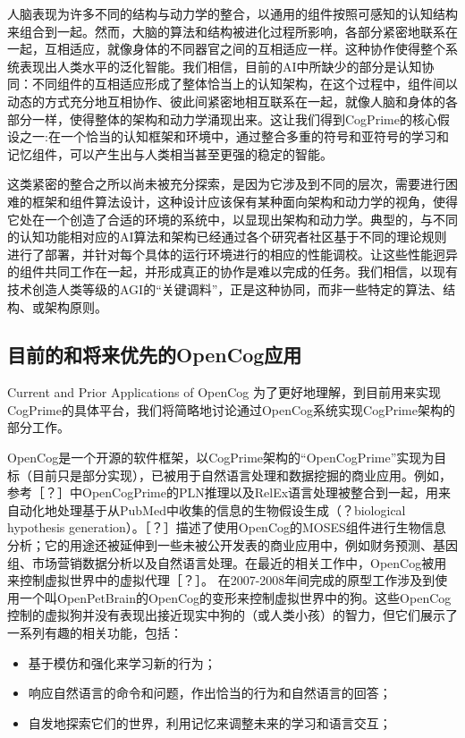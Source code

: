 人脑表现为许多不同的结构与动力学的整合，以通用的组件按照可感知的认知结构来组合到一起。然而，大脑的算法和结构被进化过程所影响，各部分紧密地联系在一起，互相适应，就像身体的不同器官之间的互相适应一样。这种协作使得整个系统表现出人类水平的泛化智能。我们相信，目前的AI中所缺少的部分是认知协同：不同组件的互相适应形成了整体恰当上的认知架构，在这个过程中，组件间以动态的方式充分地互相协作、彼此间紧密地相互联系在一起，就像人脑和身体的各部分一样，使得整体的架构和动力学涌现出来。这让我们得到CogPrime的核心假设之一:在一个恰当的认知框架和环境中，通过整合多重的符号和亚符号的学习和记忆组件，可以产生出与人类相当甚至更强的稳定的智能。

这类紧密的整合之所以尚未被充分探索，是因为它涉及到不同的层次，需要进行困难的框架和组件算法设计，这种设计应该保有某种面向架构和动力学的视角，使得它处在一个创造了合适的环境的系统中，以显现出架构和动力学。典型的，与不同的认知功能相对应的AI算法和架构已经通过各个研究者社区基于不同的理论规则进行了部署，并针对每个具体的运行环境进行的相应的性能调校。让这些性能迥异的组件共同工作在一起，并形成真正的协作是难以完成的任务。我们相信，以现有技术创造人类等级的AGI的“关键调料”，正是这种协同，而非一些特定的算法、结构、或架构原则。

\subsection{目前的和将来优先的OpenCog应用}{Current and Prior Applications of OpenCog}
为了更好地理解，到目前用来实现CogPrime的具体平台，我们将简略地讨论通过OpenCog系统实现CogPrime架构的部分工作。

OpenCog是一个开源的软件框架，以CogPrime架构的“OpenCogPrime”实现为目标（目前只是部分实现），已被用于自然语言处理和数据挖掘的商业应用。例如，参考［？］中OpenCogPrime的PLN推理以及RelEx语言处理被整合到一起，用来自动化地处理基于从PubMed中收集的信息的生物假设生成（？biological hypothesis generation）。［？］描述了使用OpenCog的MOSES组件进行生物信息分析；它的用途还被延伸到一些未被公开发表的商业应用中，例如财务预测、基因组、市场营销数据分析以及自然语言处理。在最近的相关工作中，OpenCog被用来控制虚拟世界中的虚拟代理［？］。
在2007-2008年间完成的原型工作涉及到使用一个叫OpenPetBrain的OpenCog的变形来控制虚拟世界中的狗。这些OpenCog控制的虚拟狗并没有表现出接近现实中狗的（或人类小孩）的智力，但它们展示了一系列有趣的相关功能，包括：
\begin{itemize}
  \item 基于模仿和强化来学习新的行为；
  \item 响应自然语言的命令和问题，作出恰当的行为和自然语言的回答；
  \item 自发地探索它们的世界，利用记忆来调整未来的学习和语言交互；
\end{itemize}

